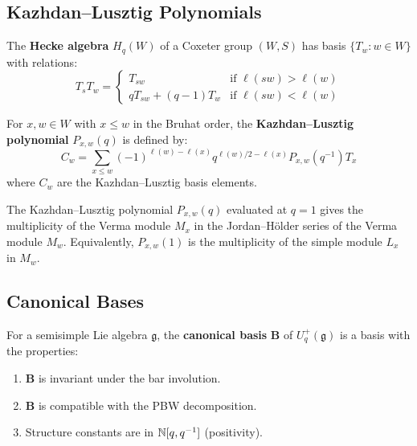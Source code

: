 \subsection{Kazhdan--Lusztig Polynomials}

\begin{definition}
The \textbf{Hecke algebra} $H_q(W)$ of a Coxeter group $(W,S)$ has basis $\{T_w: w \in W\}$ with relations:
\[
T_s T_w = \begin{cases}
T_{sw} & \text{if } \ell(sw) > \ell(w) \\
q T_{sw} + (q-1) T_w & \text{if } \ell(sw) < \ell(w)
\end{cases}
\]
\end{definition}

\begin{definition}
For $x, w \in W$ with $x \leq w$ in the Bruhat order, the \textbf{Kazhdan--Lusztig polynomial} $P_{x,w}(q)$ is defined by:
\[
C_w = \sum_{x \leq w} (-1)^{\ell(w) - \ell(x)} q^{\ell(w)/2 - \ell(x)} P_{x,w}(q^{-1}) T_x
\]
where $C_w$ are the Kazhdan--Lusztig basis elements.
\end{definition}

\begin{theorem}
The Kazhdan--Lusztig polynomial $P_{x,w}(q)$ evaluated at $q = 1$ gives the multiplicity of the Verma module $M_x$ in the Jordan--H\"older series of the Verma module $M_w$. Equivalently, $P_{x,w}(1)$ is the multiplicity of the simple module $L_x$ in $M_w$.
\end{theorem}

\subsection{Canonical Bases}

\begin{definition}
For a semisimple Lie algebra $\mathfrak{g}$, the \textbf{canonical basis} $\mathbf{B}$ of $U_q^+(\mathfrak{g})$ is a basis with the properties:
\begin{enumerate}
    \item $\mathbf{B}$ is invariant under the bar involution.
    \item $\mathbf{B}$ is compatible with the PBW decomposition.
    \item Structure constants are in $\mathbb{N}[q, q^{-1}]$ (positivity).
\end{enumerate}
\end{definition}

